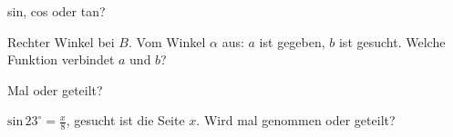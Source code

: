 \setcounter{aufgabe}{11}

\begin{aufgabe}{sin, cos oder tan?}
\begin{teile}
\teil Rechter Winkel bei $B$. Vom Winkel $\alpha$ aus: $a$ ist gegeben, $b$ ist gesucht. Welche Funktion verbindet $a$ und $b$? \\   

\end{teile}
\end{aufgabe}

\begin{aufgabe}{Mal oder geteilt?}
\begin{teile}
\teil $\mathrm{sin}\,23^\circ = \frac{x}{8}$, gesucht ist die Seite $x$. Wird mal genommen oder geteilt? \\  \\ 
\end{teile}
\end{aufgabe}

